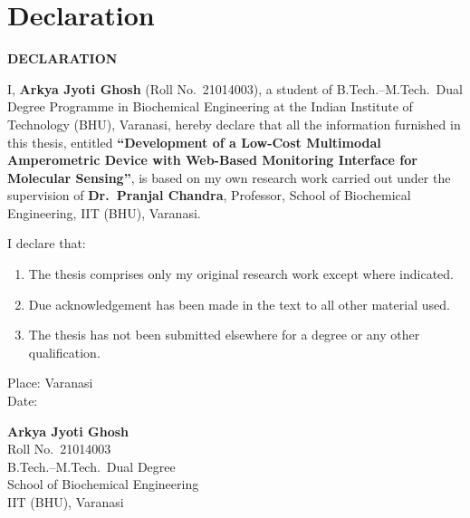 \chapter*{Declaration}
\thispagestyle{plain}

\begin{center}
{\Large \textbf{DECLARATION}}
\end{center}

\vspace{0.8cm}

I, \textbf{Arkya Jyoti Ghosh} (Roll No.\ 21014003), a student of B.Tech.--M.Tech.\ Dual Degree Programme in Biochemical Engineering at the Indian Institute of Technology (BHU), Varanasi, hereby declare that all the information furnished in this thesis, entitled \textbf{``Development of a Low-Cost Multimodal Amperometric Device with Web-Based Monitoring Interface for Molecular Sensing''}, is based on my own research work carried out under the supervision of \textbf{Dr.\ Pranjal Chandra}, Professor, School of Biochemical Engineering, IIT (BHU), Varanasi.

\vspace{0.5cm}

I declare that:
\begin{enumerate}
    \item The thesis comprises only my original research work except where indicated.
    \item Due acknowledgement has been made in the text to all other material used.
    \item The thesis has not been submitted elsewhere for a degree or any other qualification.
\end{enumerate}

\vspace{2.5cm}

\noindent
\begin{minipage}[t]{0.45\textwidth}
Place: Varanasi\\[0.2cm]
Date: \underline{\hspace{4cm}}
\end{minipage}
\hfill
\begin{minipage}[t]{0.45\textwidth}
\textbf{Arkya Jyoti Ghosh}\\
Roll No.\ 21014003\\
B.Tech.--M.Tech.\ Dual Degree\\
School of Biochemical Engineering\\
IIT (BHU), Varanasi
\end{minipage}

